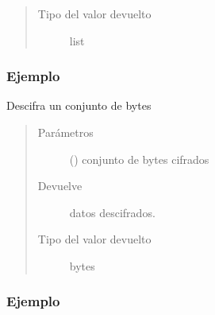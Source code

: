 \documentclass[a4paper,12pt,spanish]{sphinxmanual}
\begin{document}
\begin{fulllineitems}
\begin{fulllineitems}
\begin{quote}
\begin{description}
\item[{Tipo del valor devuelto}] \leavevmode
list

\end{description}\end{quote}
\subsubsection*{Ejemplo}

\begin{sphinxVerbatim}[commandchars=\\\{\}]
   
  
\end{sphinxVerbatim}

\end{fulllineitems}


\begin{fulllineitems}
\label{\detokenize{openerm.Cipher:openerm.Cipher.Cipher.decode}}
Descifra un conjunto de bytes
\begin{quote}\begin{description}
\item[{Parámetros}] \leavevmode
{} () \textendash{} conjunto de bytes cifrados

\item[{Devuelve}] \leavevmode
datos descifrados.

\item[{Tipo del valor devuelto}] \leavevmode
bytes

\end{description}\end{quote}
\subsubsection*{Ejemplo}


\end{fulllineitems}
\end{fulllineitems}
\end{document}
